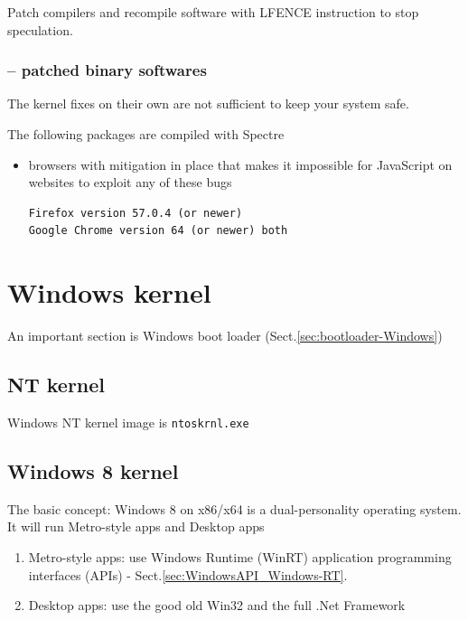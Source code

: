 Patch compilers and recompile software with LFENCE instruction to stop
speculation.




\subsection{-- patched binary softwares}

The kernel fixes on their own are not sufficient to keep your system safe.
 
The following packages are compiled with Spectre
\begin{itemize} 
  \item  browsers with mitigation in place that makes it impossible for
  JavaScript on websites to exploit any of these bugs

\begin{verbatim}
Firefox version 57.0.4 (or newer) 
Google Chrome version 64 (or newer) both
\end{verbatim}
  
  
\end{itemize}

\chapter{Windows kernel}
\label{chap:Windows-kernel}

An important section is Windows boot loader (Sect.\ref{sec:bootloader-Windows})

\section{NT kernel}
\label{sec:Windows-NT-kernel}

Windows NT kernel image is \verb!ntoskrnl.exe!

\section{Windows 8 kernel}

The basic concept: Windows 8 on x86/x64 is a dual-personality operating system.
It will run Metro-style apps and Desktop apps
\begin{enumerate}
  \item Metro-style apps: use Windows Runtime (WinRT) application programming
  interfaces (APIs) - Sect.\ref{sec:WindowsAPI_Windows-RT}.
  
  \item Desktop apps: use the good old Win32 and the full .Net Framework
\end{enumerate}

